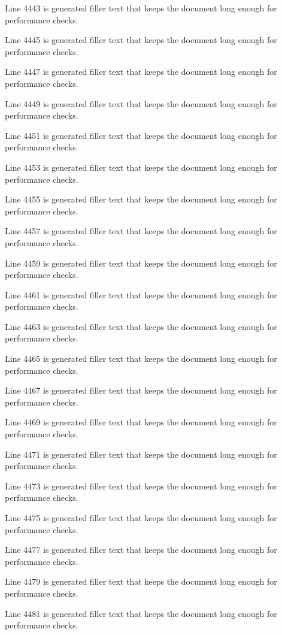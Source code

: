 Line 4443 is generated filler text that keeps the document long enough for performance checks.

Line 4445 is generated filler text that keeps the document long enough for performance checks.

Line 4447 is generated filler text that keeps the document long enough for performance checks.

Line 4449 is generated filler text that keeps the document long enough for performance checks.

Line 4451 is generated filler text that keeps the document long enough for performance checks.

Line 4453 is generated filler text that keeps the document long enough for performance checks.

Line 4455 is generated filler text that keeps the document long enough for performance checks.

Line 4457 is generated filler text that keeps the document long enough for performance checks.

Line 4459 is generated filler text that keeps the document long enough for performance checks.

Line 4461 is generated filler text that keeps the document long enough for performance checks.

Line 4463 is generated filler text that keeps the document long enough for performance checks.

Line 4465 is generated filler text that keeps the document long enough for performance checks.

Line 4467 is generated filler text that keeps the document long enough for performance checks.

Line 4469 is generated filler text that keeps the document long enough for performance checks.

Line 4471 is generated filler text that keeps the document long enough for performance checks.

Line 4473 is generated filler text that keeps the document long enough for performance checks.

Line 4475 is generated filler text that keeps the document long enough for performance checks.

Line 4477 is generated filler text that keeps the document long enough for performance checks.

Line 4479 is generated filler text that keeps the document long enough for performance checks.

Line 4481 is generated filler text that keeps the document long enough for performance checks.

